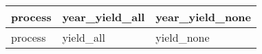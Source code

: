 \begin{tabular}{lll}
\toprule
process & year\_yield\_all & year\_yield\_none \\
\midrule
process &      yield\_all &      yield\_none \\
\bottomrule
\end{tabular}
